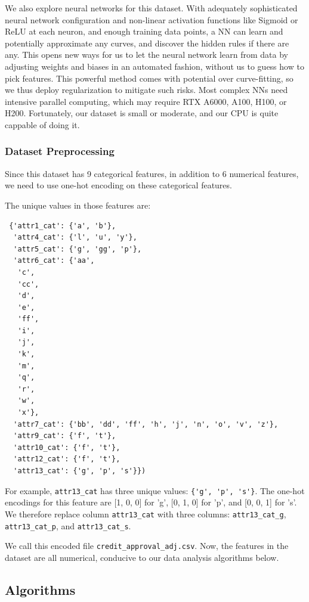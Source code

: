 We also explore neural networks for this dataset. With adequately sophisticated neural network configuration and non-linear activation functions like Sigmoid or ReLU at each neuron, and enough training data points, a NN can learn and potentially approximate any curves, and discover the hidden rules if there are any. This opens new ways for us to let the neural network learn from data by adjusting weights and biases in an automated fashion, without us to guess how to pick features. This powerful method comes with potential over curve-fitting, so we thus deploy regularization to mitigate such risks. Most complex NNs need intensive parallel computing, which may require RTX A6000, A100, H100, or H200. Fortunately, our dataset is small or moderate, and our CPU is quite cappable of doing it.

\subsubsection{Dataset Preprocessing}

Since this dataset has 9 categorical features, in addition to 6 numerical features, we need to use one-hot encoding on these categorical features.  

The unique values in those features are:

\begin{verbatim}
 {'attr1_cat': {'a', 'b'},
  'attr4_cat': {'l', 'u', 'y'},
  'attr5_cat': {'g', 'gg', 'p'},
  'attr6_cat': {'aa',
   'c',
   'cc',
   'd',
   'e',
   'ff',
   'i',
   'j',
   'k',
   'm',
   'q',
   'r',
   'w',
   'x'},
  'attr7_cat': {'bb', 'dd', 'ff', 'h', 'j', 'n', 'o', 'v', 'z'},
  'attr9_cat': {'f', 't'},
  'attr10_cat': {'f', 't'},
  'attr12_cat': {'f', 't'},
  'attr13_cat': {'g', 'p', 's'}})
\end{verbatim}

For example, \verb|attr13_cat| has three unique values: \verb|{'g', 'p', 's'}|.
The one-hot encodings for this feature are [1, 0, 0] for 'g', [0, 1, 0] for 'p', and [0, 0, 1] for 's'.
We therefore replace column \verb|attr13_cat| with three columns: \verb|attr13_cat_g|, \verb|attr13_cat_p|, and \verb|attr13_cat_s|.
  
We call this encoded file \verb|credit_approval_adj.csv|.
Now, the features in the dataset are all numerical, conducive to our data analysis algorithms below.
 
\subsection{Algorithms}

